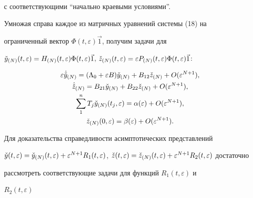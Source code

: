 с соответствующими ``начально краевыми условиями''. 


 


Умножая справа каждое из матричных уравнений системы (18) на 


ограниченный вектор $\Phi(t,\varepsilon)\Vec 1$, получим задачи для 


$\Check y_{(N)}(t,\varepsilon)=H_{(N)}(t,\varepsilon) 


\Phi(t,\varepsilon)\Vec 1$, $\Check z_{(N)}(t,\varepsilon)=\varepsilon 


P_{(N)}(t,\varepsilon)\Phi(t,\varepsilon)\Vec 1$: 


\begin{gather*} 


\varepsilon\DC{y}_{(N)}=(\Lambda_0+\varepsilon B) 


\Check y_{(N)}+B_{12}\Check z_{(N)}+O(\varepsilon^{N+1}), \\ 


% 


\DC{z}_{(N)}=B_{21}\Check y_{(N)}+B_{22}\Check z_{(N)} 


+O(\varepsilon^{N+1}), \\ 


% 


\sum^n_1 T_j\Check y_{(N)}(t_j,\varepsilon)= 


\alpha(\varepsilon)+O(\varepsilon^{N+1}), \\ 


% 


\Check z_{(N)}(0,\varepsilon)=\beta(\varepsilon)+ 


O(\varepsilon^{N+1}). 


\end{gather*} 


 


Для доказательства справедливости асимптотических представлений 


$\Check y(t,\varepsilon)=\Check y_{(N)}(t,\varepsilon)+ 


\varepsilon^{N+1}R_1(t,\varepsilon)$, $\Check z(t,\varepsilon)=\Check 


z_{(N)}(t,\varepsilon)+\varepsilon^{N+1}R_2(t,\varepsilon)$ достаточно 


рассмотреть соответствующие задачи для функций $R_1(t,\varepsilon)$ и 


$R_2(t,\varepsilon)$ 


